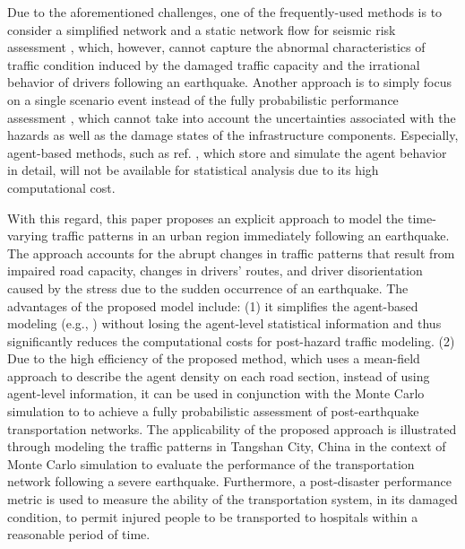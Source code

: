 \documentclass[review,11pt,nonatbib]{elsarticle}
\begin{document}
\par Due to the aforementioned challenges, one of the frequently-used methods is to consider a simplified network and a static network flow for seismic risk assessment \citep{Duenas2007Seismic,Miller2015Estimating}, which, however, cannot capture the abnormal characteristics of traffic condition induced by the damaged traffic capacity and the irrational behavior of drivers following an earthquake. Another approach is to simply focus on a single scenario event instead of the fully probabilistic performance assessment  \citep{freckleton2012evaluation,chang2012post,feng2017post}, which cannot take into account the uncertainties associated with the hazards as well as the damage states of the infrastructure components. Especially, agent-based methods, such as ref. \citet{feng2017post}, which store and simulate the agent behavior in detail, will not be available for statistical analysis due to its high computational cost. 

With this regard, this paper proposes an explicit approach to model the time-varying traffic patterns in an urban region immediately following an earthquake. The approach accounts for the abrupt changes in traffic patterns that result from impaired road capacity, changes in drivers' routes, and driver disorientation caused by the stress due to the sudden occurrence of an earthquake. The advantages of the proposed model include: (1) it simplifies the agent-based modeling (e.g., \citet{feng2017post}) without losing the agent-level statistical information and thus significantly reduces the computational costs for post-hazard traffic modeling. (2) Due to the high efficiency of the proposed method, which uses a mean-field approach to describe the agent density on each road section, instead of using agent-level information, it can be used in conjunction with  the Monte Carlo simulation to to achieve a fully probabilistic assessment of post-earthquake transportation networks. The applicability of the proposed approach is illustrated through modeling the traffic patterns in Tangshan City, China in the context of Monte Carlo simulation to evaluate the performance of the transportation network following a severe earthquake. Furthermore, a post-disaster performance metric is used to measure the ability of the transportation system, in its damaged condition, to permit injured people to be transported to hospitals within a reasonable period of time.
\end{document}
